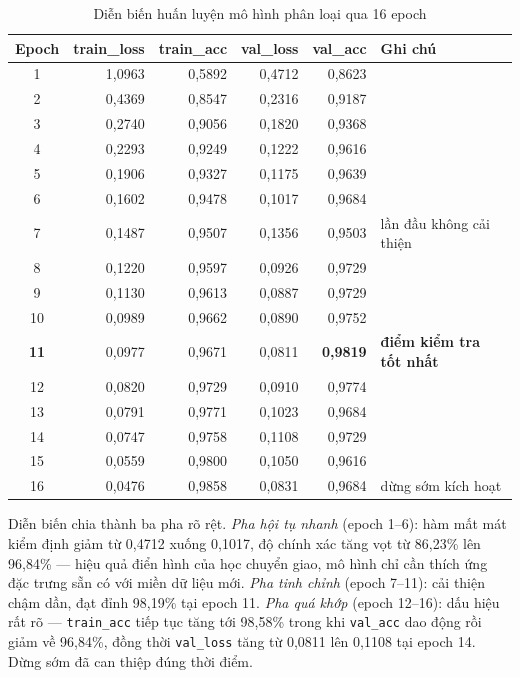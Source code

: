 \begin{table}[H]
\centering
\caption{Diễn biến huấn luyện mô hình phân loại qua 16 epoch}
\label{tab:cls_history}
\small
\begin{tabular}{c r r r r l}
\toprule
\textbf{Epoch} & \textbf{train\_loss} & \textbf{train\_acc} & \textbf{val\_loss} & \textbf{val\_acc} & \textbf{Ghi chú} \\
\midrule
1  & 1,0963 & 0,5892 & 0,4712 & 0,8623 & \\
2  & 0,4369 & 0,8547 & 0,2316 & 0,9187 & \\
3  & 0,2740 & 0,9056 & 0,1820 & 0,9368 & \\
4  & 0,2293 & 0,9249 & 0,1222 & 0,9616 & \\
5  & 0,1906 & 0,9327 & 0,1175 & 0,9639 & \\
6  & 0,1602 & 0,9478 & 0,1017 & 0,9684 & \\
7  & 0,1487 & 0,9507 & 0,1356 & 0,9503 & lần đầu không cải thiện \\
8  & 0,1220 & 0,9597 & 0,0926 & 0,9729 & \\
9  & 0,1130 & 0,9613 & 0,0887 & 0,9729 & \\
10 & 0,0989 & 0,9662 & 0,0890 & 0,9752 & \\
\textbf{11} & 0,0977 & 0,9671 & 0,0811 & \textbf{0,9819} & \textbf{điểm kiểm tra tốt nhất} \\
12 & 0,0820 & 0,9729 & 0,0910 & 0,9774 & \\
13 & 0,0791 & 0,9771 & 0,1023 & 0,9684 & \\
14 & 0,0747 & 0,9758 & 0,1108 & 0,9729 & \\
15 & 0,0559 & 0,9800 & 0,1050 & 0,9616 & \\
16 & 0,0476 & 0,9858 & 0,0831 & 0,9684 & dừng sớm kích hoạt \\
\bottomrule
\end{tabular}
\end{table}

Diễn biến chia thành ba pha rõ rệt. \emph{Pha hội tụ nhanh} (epoch 1--6): hàm mất
mát kiểm định giảm từ 0,4712 xuống 0,1017, độ chính xác tăng vọt từ 86,23\% lên
96,84\% --- hiệu quả điển hình của học chuyển giao, mô hình chỉ cần thích ứng đặc
trưng sẵn có với miền dữ liệu mới. \emph{Pha tinh chỉnh} (epoch 7--11): cải thiện
chậm dần, đạt đỉnh 98,19\% tại epoch 11. \emph{Pha quá khớp} (epoch 12--16): dấu
hiệu rất rõ --- \texttt{train\_acc} tiếp tục tăng tới 98,58\% trong khi
\texttt{val\_acc} dao động rồi giảm về 96,84\%, đồng thời \texttt{val\_loss} tăng
từ 0,0811 lên 0,1108 tại epoch 14. Dừng sớm đã can thiệp đúng thời điểm.

